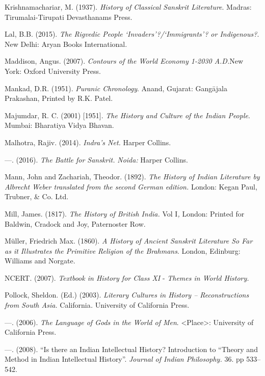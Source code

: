 \begin{thebibliography}{99}
  Krishnamachariar, M. (1937). \textit{History of Classical Sanskrit Literature}. Madras: Tirumalai-Tirupati Devasthanams Press.

  Lal, B.B. (2015). \textit{The Rigvedic People ‘Invaders’?/‘Immigrants’? or Indigenous?}. New Delhi: Aryan Books International.

  Maddison, Angus. (2007). \textit{Contours of the World Economy 1-2030 A.D.}New York: Oxford University Press.

  Mankad, D.R. (1951). \textit{Puranic Chronology}. Anand, Gujarat: Gangājala Prakashan, Printed by R.K. Patel.

  Majumdar, R. C. (2001) [1951]. \textit{The History and Culture of the Indian People}. Mumbai: Bharatiya Vidya Bhavan.

  Malhotra, Rajiv. (2014). \textit{Indra’s Net.} Harper Collins.

  —. (2016). \textit{The Battle for Sanskrit.} \textit{Noida:} Harper Collins.

  Mann, John and Zachariah, Theodor. (1892). \textit{The History of Indian Literature by Albrecht Weber translated from the second German edition.} London: Kegan Paul, Trubner, \& Co. Ltd.

  Mill, James. (1817). \textit{The History of British India.} Vol I\textit{,} London: Printed for Baldwin, Cradock and Joy, Paternoster Row.

  Müller, Friedrich Max. (1860). \textit{A History of Ancient Sanskrit Literature So Far as it Illustrates the Primitive Religion of the Brahmans}. London, Edinburg: Williams and Norgate.

  NCERT. (2007). \textit{Textbook in History for Class XI} - \textit{Themes in World History.}

  Pollock, Sheldon. (Ed.) (2003). \textit{Literary Cultures in History – Reconstructions from South Asia.} California\textit{.} University of California Press.

  —. (2006). \textit{The Language of Gods in the World of Men}. \textless Place\textgreater : University of California Press.

  —. (2008). “Is there an Indian Intellectual History? Introduction to “Theory and Method in Indian Intellectual History”. \textit{Journal of Indian Philosophy.} 36. pp 533–542.


\end{thebibliography}
